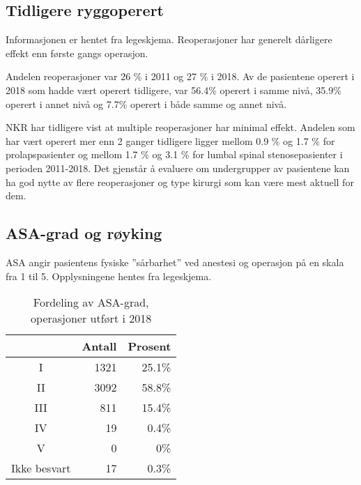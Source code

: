 \documentclass [norsk,a4paper,twoside]{article}\usepackage[]{graphicx}\usepackage[]{color}
\begin{document}
\clearpage

\subsection{Tidligere ryggoperert}
Informasjonen er hentet fra legeskjema.
Reoperasjoner har generelt dårligere effekt enn første gangs operasjon.





Andelen reoperasjoner var 26 \% i 2011 og 27 \% i 2018.
Av de pasientene operert i 2018 som hadde vært operert tidligere, var 56.4\% 
operert i samme nivå, 35.9\% 
operert i annet nivå og 7.7\% 
operert i både samme og annet nivå.




NKR har tidligere vist at multiple reoperasjoner har minimal effekt. Andelen som har vært operert 
mer enn 2 ganger tidligere ligger mellom 0.9 \%
og 1.7 \% for prolapspasienter og mellom 1.7 \%
og 3.1 \% for lumbal spinal stenosepasienter i perioden 2011-2018. 
Det gjenstår å evaluere om undergrupper av pasientene kan ha god nytte av flere reoperasjoner og type kirurgi som kan være mest aktuell for dem.


\subsection{ASA-grad og røyking}
ASA angir pasientens fysiske ”sårbarhet” ved anestesi og operasjon på en skala fra 1 til 5. 
Opplysningene hentes fra legeskjema.
\begin{table}[ht]
\centering
\begin{tabular}{crr}
  \hline
 & Antall & Prosent \\ 
  \hline
I & 1321 & 25.1\% \\ 
  II & 3092 & 58.8\% \\ 
  III & 811 & 15.4\% \\ 
  IV & 19 & 0.4\% \\ 
  V & 0 & 0\% \\ 
  Ikke besvart & 17 & 0.3\% \\ 
   \hline
\end{tabular}
\caption{Fordeling av ASA-grad, operasjoner utført i 2018} 
\label{tab:ASA}
\end{table}
\end{document}
